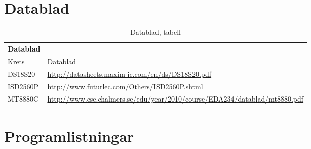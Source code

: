 \documentclass[a4paper,11pt]{article}
\begin{document}
	\section{Datablad}
	
	\label{sec:datablad}
	
	\begin{table} [H]
	\caption{Datablad, tabell} 
	\label{tab:databladsTabell}

		\begin{tabular}{l l}
		{\bf Datablad}
		\\{Krets} & {Datablad}\\
		\hline
			DS18S20 	& {\small \url{http://datasheets.maxim-ic.com/en/ds/DS18S20.pdf}}\\
			ISD2560P 	& {\small \url{http://www.futurlec.com/Others/ISD2560P.shtml}}\\
			MT8880C 	& {\small \url{http://www.cse.chalmers.se/edu/year/2010/course/EDA234/datablad/mt8880.pdf}}\\
		\end{tabular}
	\end{table}

\pagebreak

	\section{Programlistningar}
	\label{sec:programlistningar}	
		
		
		
		
		
		
\end{document}
